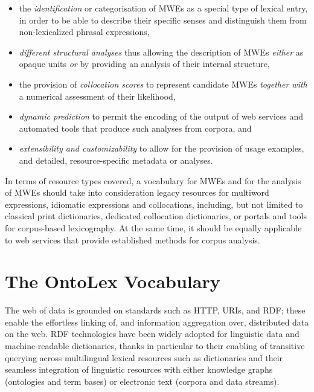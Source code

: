 \documentclass[output=paper,colorlinks,citecolor=brown]{langscibook}
\begin{document}
\begin{itemize}
    \item the \textit{identification} or categorisation of MWEs as a special type of lexical entry, in order to be able to describe their specific senses and distinguish them from non-lexicalized phrasal expressions,
    \item \textit{different structural analyses} thus allowing the description of MWEs \emph{either} as opaque units \emph{or} by providing an analysis of their internal structure,
    \item the provision of \textit{collocation scores} to represent candidate MWEs \textit{together with} a numerical assessment of their likelihood,
    \item \textit{dynamic prediction} to permit the encoding of the output of web services and automated tools that produce such analyses from corpora, and
    \item \textit{extensibility and customizability} to allow for the provision of usage examples, and detailed, resource-specific metadata or analyses.
\end{itemize}
In terms of resource types covered, a vocabulary for MWEs and for the analysis of MWEs should take into consideration legacy resources for multiword expressions, idiomatic expressions and collocations, including, but not limited to classical print dictionaries, dedicated collocation dictionaries, or portals and tools for corpus-based lexicography. At the same time, it should be equally applicable to web services that provide established methods for corpus analysis. %

\section{The OntoLex Vocabulary}
\label{sec:ontolex}


The web of data is grounded on standards such as HTTP, URIs, and RDF; these enable the effortless linking of, and information aggregation over, distributed data on the web.  RDF technologies have been widely adopted for linguistic data and machine-readable dictionaries, thanks in particular to their enabling of transitive querying across multilingual lexical resources such as dictionaries and their seamless integration of linguistic resources with either knowledge graphs (ontologies and term bases) or electronic text (corpora and data streams).
\end{document}
